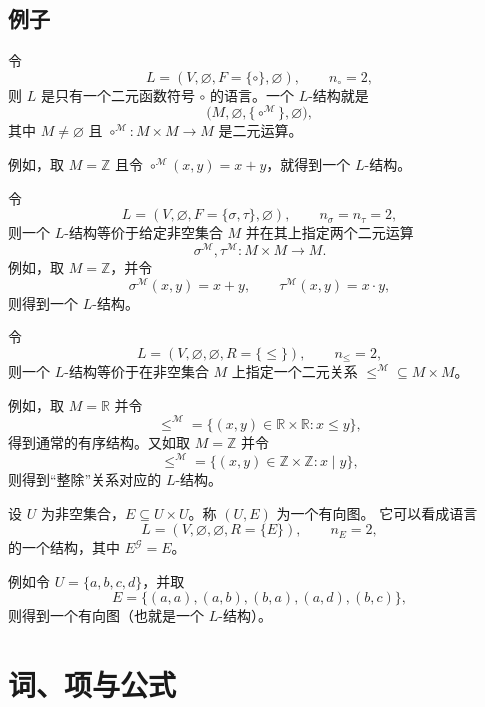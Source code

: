 \documentclass[lang=cn,a4paper,newtx,section]{elegantbook}
\begin{document}
\section{例子}

\begin{example}
令
\[
  L=(V,\varnothing,F=\{\circ\},\varnothing),\qquad n_{\circ}=2,
\]
则 $L$ 是只有一个二元函数符号 $\circ$ 的语言。一个 $L$-结构就是
\[
  \bigl(M,\varnothing,\{\circ^{\mathcal M}\},\varnothing\bigr),
\]
其中 $M\neq\varnothing$ 且 $\circ^{\mathcal M}:M\times M\to M$ 是二元运算。

例如，取 $M=\mathbb Z$ 且令 $\circ^{\mathcal M}(x,y)=x+y$，就得到一个 $L$-结构。
\end{example}

\begin{example}
令
\[
  L=(V,\varnothing,F=\{\sigma,\tau\},\varnothing),\qquad n_{\sigma}=n_{\tau}=2,
\]
则一个 $L$-结构等价于给定非空集合 $M$ 并在其上指定两个二元运算
\[
  \sigma^{\mathcal M},\tau^{\mathcal M}:M\times M\to M.
\]
例如，取 $M=\mathbb Z$，并令
\[
  \sigma^{\mathcal M}(x,y)=x+y,\qquad \tau^{\mathcal M}(x,y)=x\cdot y,
\]
则得到一个 $L$-结构。
\end{example}

\begin{example}
令
\[
  L=(V,\varnothing,\varnothing,R=\{\le\}),\qquad n_{\le}=2,
\]
则一个 $L$-结构等价于在非空集合 $M$ 上指定一个二元关系 $\le^{\mathcal M}\subseteq M\times M$。

例如，取 $M=\mathbb R$ 并令
\[
  \le^{\mathcal M}=\{(x,y)\in\mathbb R\times\mathbb R: x\le y\},
\]
得到通常的有序结构。又如取 $M=\mathbb Z$ 并令
\[
  \le^{\mathcal M}=\{(x,y)\in\mathbb Z\times\mathbb Z: x\mid y\},
\]
则得到“整除”关系对应的 $L$-结构。
\end{example}

\begin{example}[有向图作为结构]
设 $U$ 为非空集合，$E\subseteq U\times U$。称 $(U,E)$ 为一个有向图。
它可以看成语言
\[
  L=(V,\varnothing,\varnothing,R=\{E\}),\qquad n_E=2,
\]
的一个结构，其中 $E^{\mathcal G}=E$。

例如令 $U=\{a,b,c,d\}$，并取
\[
  E=\{(a,a),(a,b),(b,a),(a,d),(b,c)\},
\]
则得到一个有向图（也就是一个 $L$-结构）。
\end{example}

\chapter{词、项与公式}
\end{document}
